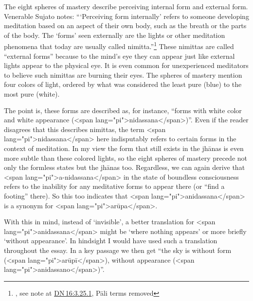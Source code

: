 \documentclass[10pt, openright]{book}
\begin{document}
The eight spheres of mastery describe perceiving internal form and external form. Venerable Sujato notes: “‘Perceiving form internally’ refers to someone developing meditation based on an aspect of their own body, such as the breath or the parts of the body. The ‘forms’ seen externally are the lights or other meditation phenomena that today are usually called nimitta.”\footnote {\cite{Sujato 2018}, see note at \href{https://suttacentral.net/dn16/en/sujato\#3.25.1}{DN 16:3.25.1}, Pāli terms removed} These nimittas are called “external forms” because to the mind’s eye they can appear just like external lights appear to the physical eye. It is even common for unexperienced meditators to believe such nimittas are burning their eyes. The spheres of mastery mention four colors of light, ordered by what was considered the least pure (blue) to the most pure (white).


The point is, these forms are described as, for instance, “forms with white color and white appearance (<span lang="pi">nidassana</span>)”. Even if the reader disagrees that this describes nimittas, the term <span lang="pi">nidassana</span> here indisputably refers to certain forms in the context of meditation. In my view the form that still exists in the jhānas is even more subtle than these colored lights, so the eight spheres of mastery precede not only the formless states but the jhānas too. Regardless, we can again derive that <span lang="pi">a-nidassana</span> in the state of boundless consciousness refers to the inability for any meditative forms to appear there (or “find a footing” there). So this too indicates that <span lang="pi">anidassana</span> is a synonym for <span lang="pi">arūpa</span>.


With this in mind, instead of ‘invisible’, a better translation for <span lang="pi">anidassana</span> might be ‘where nothing appears’ or more briefly ‘without appearance’. In hindsight I would have used such a translation throughout the essay. In a key passage we then get “the sky is without form (<span lang="pi">arūpī</span>), without appearance (<span lang="pi">anidassano</span>)”.
\end{document}
